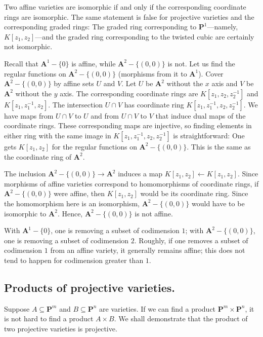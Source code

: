 \documentclass [11 pt, oneside] {article}
\begin{document}
\begin{remark}
	Two affine varieties are isomorphic if and only if the corresponding coordinate rings are isomorphic. The same statement is false for projective varieties and the corresponding graded rings: The graded ring corresponding to $\mathbf{P}^1$---namely, $K[z_1,z_2]$---and the graded ring corresponding to the twisted cubic are certainly not isomorphic.
\end{remark}

\begin{example}[ ]\label{}
Recall that $\mathbf{A}^1-\{0\}$ is affine, while $\mathbf{A}^2 - \{(0,0)\}$ is not. Let us find the regular functions on $\mathbf{A}^2 - \{(0,0)\}$ (morphisms from it to $\mathbf{A}^1$). Cover $\mathbf{A}^2-\{(0,0)\}$ by affine sets $U$ and $V$. Let $U$ be $\mathbf{A}^2$ without the $x$ axis and $V$ be $\mathbf{A}^2$ without the $y$ axis. The corresponding coordinate rings are $K[z_1,z_2,z_2^{-1}]$ and $K[z_1,z_1^{-1},z_2]$. The intersection $U\cap V$ has coordinate ring $K[z_1,z_1^{-1},z_2,z_2^{-1}]$. We have maps from $U\cap V$ to $U$ and from $U\cap V$ to $V$ that induce dual maps of the coordinate rings. These corresponding maps are injective, so finding elements in either ring with the same image in $K[z_1,z_1^{-1},z_2,z_2^{-1}]$ is straightforward: One gets $K[z_1,z_2]$ for the regular functions on $\mathbf{A}^2-\{(0,0)\}$. This is the same as the coordinate ring of $\mathbf{A}^2$.

The inclusion $\mathbf{A}^2-\{(0,0)\}\longrightarrow \mathbf{A}^2$ induces a map $K[z_1,z_2] \longleftarrow K[z_1,z_2]$. Since morphisms of affine varieties correspond to homomorphisms of coordinate rings, if $\mathbf{A}^2-\{(0,0)\}$ were affine, then $K[z_1,z_2]$ would be its coordinate ring. Since the homomorphism here is an isomorphism, $\mathbf{A}^2-\{(0,0)\}$ would have to be isomorphic to $\mathbf{A}^2$. Hence, $\mathbf{A}^2-\{(0,0)\}$ is not affine.
\end{example}

\begin{remark}
	With $\mathbf{A}^1-\{0\}$, one is removing a subset of codimension $1$; with $\mathbf{A}^2-\{(0,0)\}$, one is removing a subset of codimension $2$. Roughly, if one removes a subset of codimension $1$ from an affine variety, it generally remains affine; this does not tend to happen for codimension greater than $1$.
\end{remark}


\subsection{Products of projective varieties.}
Suppose $A\subseteq \mathbf{P}^m$ and $B\subseteq \mathbf{P}^n$ are varieties. If we can find a product $\mathbf{P}^m\times \mathbf{P}^n$, it is not hard to find a product $A\times B$. We shall demonstrate that the product of two projective varieties is projective.
\end{document}
